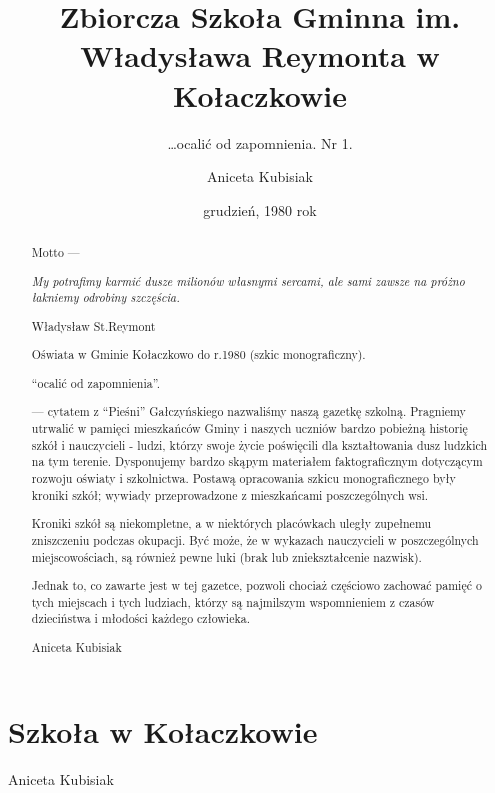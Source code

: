 \documentclass[12pt,a4paper]{scrreprt}
\begin{document}
\title{Zbiorcza Szkoła Gminna im. Władysława Reymonta w Kołaczkowie}
\subtitle{\ldots{}ocalić od zapomnienia. Nr 1.}
\author{Aniceta Kubisiak}
\date{grudzień, 1980 rok}
\maketitle

\begin{abstract}
Motto --- 

\epigraph{\itshape My potrafimy karmić dusze milionów własnymi
  sercami, ale sami zawsze na próżno łakniemy odrobiny
  szczęścia.}{Władysław St.Reymont}

Oświata w Gminie Kołaczkowo do r.1980 (szkic monograficzny).

\newpage

``ocalić od zapomnienia''.

--- cytatem z ``Pieśni'' Gałczyńskiego nazwaliśmy naszą gazetkę
szkolną. Pragniemy utrwalić w pamięci mieszkańców Gminy i naszych
uczniów bardzo pobieżną historię szkół i nauczycieli - ludzi, którzy
swoje życie poświęcili dla kształtowania dusz ludzkich na tym
terenie. Dysponujemy bardzo skąpym materiałem faktograficznym
dotyczącym rozwoju oświaty i szkolnictwa. Postawą opracowania szkicu
monograficznego były kroniki szkół; wywiady przeprowadzone z
mieszkańcami poszczególnych wsi.

Kroniki szkół są niekompletne, a w niektórych placówkach uległy
zupełnemu zniszczeniu podczas okupacji. Być może, że w wykazach
nauczycieli w poszczególnych miejscowościach, są również pewne luki
(brak lub zniekształcenie nazwisk).

Jednak to, co zawarte jest w tej gazetce, pozwoli chociaż częściowo
zachować pamięć o tych miejscach i tych ludziach, którzy są najmilszym
wspomnieniem z czasów dzieciństwa i młodości każdego człowieka.

Aniceta Kubisiak
\end{abstract}

\chapter{Szkoła w Kołaczkowie}
Aniceta Kubisiak
\end{document}
